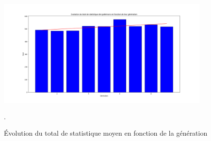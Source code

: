 \documentclass[a4paper,12pt]{article}
\begin{document}
\begin{figure}[!h]
    \centering
    \includegraphics[width=0.95\textwidth]{Image/Total_avg.png}
    \caption{Évolution du total de statistique moyen en fonction de la
    génération}.
    \label{fig:image3}
\end{figure}
\end{document}
